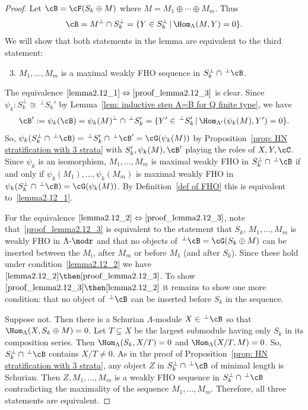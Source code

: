 \begin{proof} Let $\cB=\cF(S_k\oplus M)$ where $M=M_1\oplus\cdots\oplus M_m$. Thus 
\[
	\cB=M^\perp\cap S_k^\perp= \{Y\in S_k^\perp\,|\, \Hom_{\Lambda}(M,Y)=0\}.
\]
We will show that both statements in the lemma are equivalent to the third statement:

\begin{enumerate}\setcounter{enumi}{2}
\item\label{proof_lemma2.12_3}  %
$M_1,\ldots,M_m$ is a maximal weakly FHO sequence in $S_k^\perp\cap\,^\perp \cB$.
\end{enumerate}


The equivalence $\eqref{lemma2.12_1}\Leftrightarrow\eqref{proof_lemma2.12_3}$ is clear. Since $\psi_k:S_k^\perp\cong \,^{\perp}S_k'$ by Lemma~\ref{lem: inductive step A=B for Q finite type}, we have
\[
	\cB':=\psi_k(\cB)=\psi_k(M)^\perp\cap \,^\perp S_k'=\{Y'\in\,^{\perp}S_k'\,|\, \Hom_{\Lambda'}(\psi_k(M),Y')=0\}.
\]
So, $\psi_k(S_k^\perp\cap\,^\perp \cB)=\,^{\perp}S_k'\cap\,^\perp\cB'=\cG(\psi_k(M))$ by Proposition~\ref{prop: HN stratification with 3 strata} with $S_k',\psi_k(M),\cB'$ playing the roles of $X,Y,\cC$. Since $\psi_k$ is an isomorphism, $M_1,\ldots,M_m$ is maximal weakly FHO in $S_k^\perp\cap\,^\perp\cB$ if and only if $\psi_k(M_1),\ldots,\psi_k(M_m)$ is maximal weakly FHO in $\psi_k(S_k^\perp\cap\,^\perp \cB)=\cG(\psi_k(M))$. By Definition~\ref{def of FHO} this is equivalent to~\eqref{lemma2.12_1}.


For the equivalence $\eqref{lemma2.12_2}\Leftrightarrow\eqref{proof_lemma2.12_3}$, note that~\eqref{proof_lemma2.12_3} is equivalent to the statement that $S_k$, $M_1,\ldots,M_m$ is weakly FHO in $\Lambda\text{-}\modr $ and that no objects of $\,^\perp\cB=\cG(S_k\oplus M)$ can be inserted between the $M_i$, after $M_m$ or before $M_1$ (and after $S_k$). Since these hold under condition~\eqref{lemma2.12_2} we have $\eqref{lemma2.12_2}\then \eqref{proof_lemma2.12_3}$. To show $\eqref{proof_lemma2.12_3}\then \eqref{lemma2.12_2}$ it remains to show one more condition: that no object of $\,^\perp\cB$ can be inserted before $S_k$ in the sequence.

Suppose not. Then there is a Schurian $\Lambda$-module $X\in\,^\perp\cB$ so that $\Hom_\Lambda(X,S_k\oplus M)=0$. Let $T\subsetneq X$ be the largest submodule having only $S_k$ in its composition series. Then $\Hom_\Lambda(S_k,X/T)=0$ and $\Hom_\Lambda(X/T,M)=0$. So, $S_k^\perp\cap\,^\perp\cB$ contains $X/T\neq0$. As in the proof of Proposition~\ref{prop: HN stratification with 3 strata}, any object $Z$ in $S_k^\perp\cap\,^\perp\cB$ of minimal length is Schurian. Then $Z,M_1,\ldots,M_m$ is a weakly FHO sequence in $S_k^\perp\cap\,^\perp \cB$ contradicting the maximality of the sequence $M_1,\ldots,M_m$. Therefore, all three statements are equivalent.
\end{proof}


